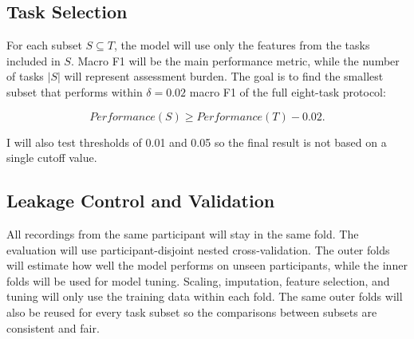 \subsection{Task Selection}

For each subset $S \subseteq T$, the model will use only the features from the tasks included in $S$. Macro F1 will be the main performance metric, while the number of tasks $|S|$ will represent assessment burden. The goal is to find the smallest subset that performs within $\delta=0.02$ macro F1 of the full eight-task protocol:

$$
Performance(S) \geq Performance(T)-0.02.
$$

I will also test thresholds of 0.01 and 0.05 so the final result is not based on a single cutoff value.

\subsection{Leakage Control and Validation}

All recordings from the same participant will stay in the same fold. The evaluation will use participant-disjoint nested cross-validation. The outer folds will estimate how well the model performs on unseen participants, while the inner folds will be used for model tuning. Scaling, imputation, feature selection, and tuning will only use the training data within each fold. The same outer folds will also be reused for every task subset so the comparisons between subsets are consistent and fair.

